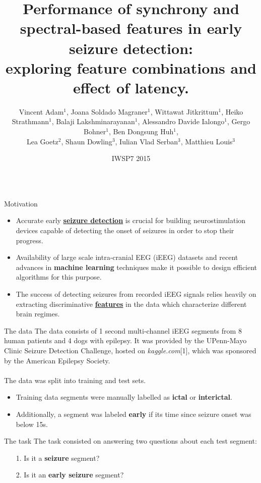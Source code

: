 \documentclass[final,t,overlay, xcolor=table, sans, mathserif]{beamer}
\title{Performance of synchrony and spectral-based features in early seizure detection:\\
exploring feature combinations and effect of latency.}
\author[Adam \& Soldado-Magraner]
{Vincent Adam$^1$, Joana Soldado Magraner$^1$, Wittawat Jitkrittum$^1$, Heiko Strathmann$^1$,
Balaji Lakshminarayanan$^1$, Alessandro Davide Ialongo$^1$, Gergo Bohner$^1$, Ben Dongsung Huh$^1$,\\
 Lea Goetz$^2$, Shaun Dowling$^3$, Iulian Vlad Serban$^3$, Matthieu Louis$^3$}
\institute[UCL]{The Gatsby Computational Neuroscience Unit$^1$, Wolfson Institute for Biomedical Research$^2$,
The Centre for Computational Statistics and Machine Learning$^3$ (CSML), UCL, London, UK.}
\date[IWSP7 2015]{IWSP7 2015}
\begin{document}
\begin{frame}{}


\begin{columns}[t]
\begin{column}{.33\linewidth}



\begin{block}{Motivation}
\begin{itemize}
\item Accurate early \underline{\bf seizure detection} is crucial for building neurostimulation devices capable of
detecting the onset of seizures in order to stop their progress.
\item Availability of large scale intra-cranial EEG (iEEG) datasets and recent advances in {\bf machine learning}
 techniques make it possible to design efficient algorithms for this purpose.
\item The success of detecting seizures from recorded iEEG signals relies heavily on
 extracting discriminative \underline{\bf features} in the data which characterize different brain regimes.
\end{itemize}
\end{block}


\begin{block}{The data}
The data consists of 1 second multi-channel iEEG segments from 8 human patients and 4 dogs with epilepsy. It was
provided by the UPenn-Mayo Clinic Seizure Detection Challenge, hosted on \emph{kaggle.com}[1], which was sponsored by the American Epilepsy Society. \\
\quad \\
The data was split into training and test sets.
\begin{itemize}
\item Training data segments were manually labelled as {\bf ictal} or {\bf interictal}.
\item Additionally, a segment was labeled {\bf early} if its time since seizure onset was below 15s.
\end{itemize}
\vspace{1cm}
\end{block}


\begin{block}{The task}
\centering
The task consisted on answering two questions about each test segment:
\begin{itemize}
\centering
\item[1.] Is it a {\bf seizure} segment?
\item [2.] Is it an {\bf early seizure} segment?
\end{itemize}
\end{block}




\end{column}
\end{columns}
\end{frame}
\end{document}
